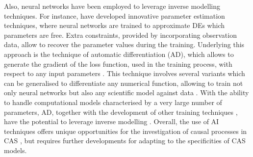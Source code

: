 %
Also, neural networks have been employed to leverage inverse modelling techniques. For instance, \cite{Raissi2019,Yazdani2020} have developed innovative parameter estimation techniques, where neural networks are trained to approximate DEs which parameters are free. Extra constraints, provided by incorporating observation data, allow to recover the parameter values during the training.
% 
Underlying this approach is the technique of automatic differentiation (AD), which allows to generate the gradient of the loss function, used in the training process, with respect to any input parameters \cite{XXX}. This technique involves several variants \cite{XXX} which can be generalised to differentiate any numerical function, allowing to train not only neural networks but also any scientific model against data \cite{Rackauckas2020}. With the ability to handle computational models characterised by a very large number of parameters, AD, together with the development of other training techniques \cite{XXX}, have the potential to leverage inverse modelling \cite{Rackauckas2020}.
% 
% 
Overall, the use of AI techniques offers unique opportunities for the investigation of causal processes in CAS  \cite{Frank2022}, but requires further developments for adapting to the specificities of CAS models.


